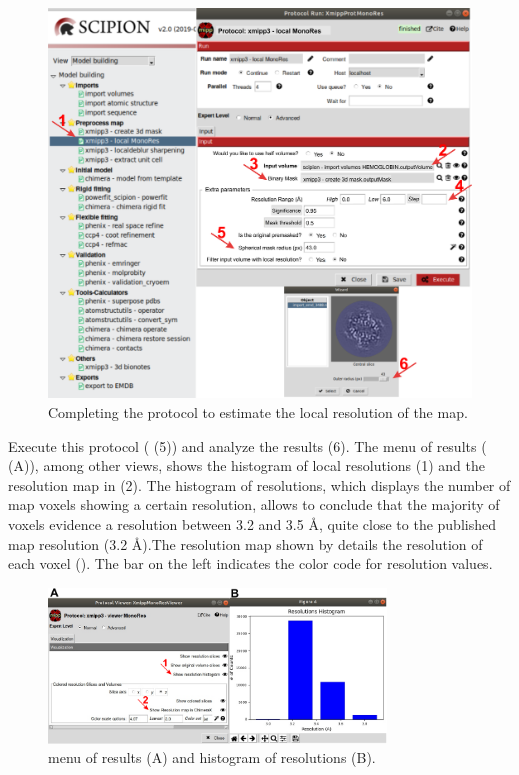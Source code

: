 \begin{figure}[H]
  \centering 
  \captionsetup{width=.9\linewidth} 
  \includegraphics[width=1\textwidth]
  {Images/Fig55}
  \caption{Completing the protocol to estimate the local resolution of the  map.}
  \label{fig:localMonoRes_1}
  \end{figure}
  
Execute this protocol ( (5)) and analyze the results (6). The menu of results ( (A)), among other views, shows the histogram of local resolutions (1) and the resolution map in \chimera (2). The histogram of resolutions, which displays the number of map voxels showing a certain resolution, allows to conclude that the majority of voxels evidence a resolution between 3.2 and 3.5 \AA, quite close to the published map resolution (3.2 \AA).The resolution map shown by \chimera details the resolution of each voxel (). The bar on the left indicates the color code for resolution values.

\begin{figure}[H]
  \centering 
  \captionsetup{width=.7\linewidth} 
  \includegraphics[width=0.80\textwidth]
  {Images/Fig56}
  \caption{ menu of results (A) and histogram of resolutions (B).}
  \label{fig:localMonoRes_2}
  \end{figure}
  
